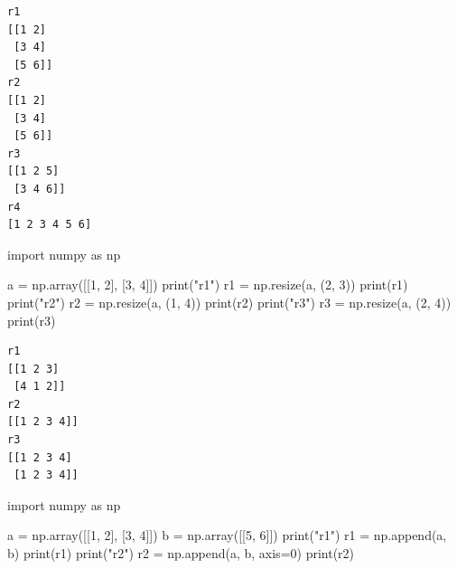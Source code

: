\documentclass[
  polish,
  letterpaper,
  DIV=11,
  numbers=noendperiod]{scrreprt}
\newenvironment{Shaded}{\begin{snugshade}}{\end{snugshade}}
\newcommand{\BuiltInTok}[1]{\textcolor[rgb]{0.00,0.23,0.31}{#1}}
\newcommand{\DecValTok}[1]{\textcolor[rgb]{0.68,0.00,0.00}{#1}}
\newcommand{\ImportTok}[1]{\textcolor[rgb]{0.00,0.46,0.62}{#1}}
\newcommand{\NormalTok}[1]{\textcolor[rgb]{0.00,0.23,0.31}{#1}}
\newcommand{\OperatorTok}[1]{\textcolor[rgb]{0.37,0.37,0.37}{#1}}
\newcommand{\StringTok}[1]{\textcolor[rgb]{0.13,0.47,0.30}{#1}}
\begin{document}
\begin{verbatim}
r1
[[1 2]
 [3 4]
 [5 6]]
r2
[[1 2]
 [3 4]
 [5 6]]
r3
[[1 2 5]
 [3 4 6]]
r4
[1 2 3 4 5 6]
\end{verbatim}

\begin{Shaded}
\begin{Highlighting}[]
\ImportTok{import}\NormalTok{ numpy }\ImportTok{as}\NormalTok{ np}

\NormalTok{a }\OperatorTok{=}\NormalTok{ np.array([[}\DecValTok{1}\NormalTok{, }\DecValTok{2}\NormalTok{], [}\DecValTok{3}\NormalTok{, }\DecValTok{4}\NormalTok{]])}
\BuiltInTok{print}\NormalTok{(}\StringTok{"r1"}\NormalTok{)}
\NormalTok{r1 }\OperatorTok{=}\NormalTok{ np.resize(a, (}\DecValTok{2}\NormalTok{, }\DecValTok{3}\NormalTok{))}
\BuiltInTok{print}\NormalTok{(r1)}
\BuiltInTok{print}\NormalTok{(}\StringTok{"r2"}\NormalTok{)}
\NormalTok{r2 }\OperatorTok{=}\NormalTok{ np.resize(a, (}\DecValTok{1}\NormalTok{, }\DecValTok{4}\NormalTok{))}
\BuiltInTok{print}\NormalTok{(r2)}
\BuiltInTok{print}\NormalTok{(}\StringTok{"r3"}\NormalTok{)}
\NormalTok{r3 }\OperatorTok{=}\NormalTok{ np.resize(a, (}\DecValTok{2}\NormalTok{, }\DecValTok{4}\NormalTok{))}
\BuiltInTok{print}\NormalTok{(r3)}
\end{Highlighting}
\end{Shaded}

\begin{verbatim}
r1
[[1 2 3]
 [4 1 2]]
r2
[[1 2 3 4]]
r3
[[1 2 3 4]
 [1 2 3 4]]
\end{verbatim}

\begin{Shaded}
\begin{Highlighting}[]
\ImportTok{import}\NormalTok{ numpy }\ImportTok{as}\NormalTok{ np}

\NormalTok{a }\OperatorTok{=}\NormalTok{ np.array([[}\DecValTok{1}\NormalTok{, }\DecValTok{2}\NormalTok{], [}\DecValTok{3}\NormalTok{, }\DecValTok{4}\NormalTok{]])}
\NormalTok{b }\OperatorTok{=}\NormalTok{ np.array([[}\DecValTok{5}\NormalTok{, }\DecValTok{6}\NormalTok{]])}
\BuiltInTok{print}\NormalTok{(}\StringTok{"r1"}\NormalTok{)}
\NormalTok{r1 }\OperatorTok{=}\NormalTok{ np.append(a, b)}
\BuiltInTok{print}\NormalTok{(r1)}
\BuiltInTok{print}\NormalTok{(}\StringTok{"r2"}\NormalTok{)}
\NormalTok{r2 }\OperatorTok{=}\NormalTok{ np.append(a, b, axis}\OperatorTok{=}\DecValTok{0}\NormalTok{)}
\BuiltInTok{print}\NormalTok{(r2)}
\end{Highlighting}
\end{Shaded}
\end{document}
